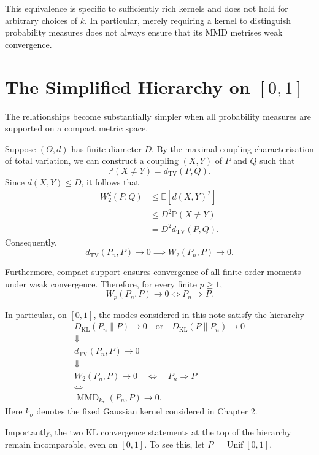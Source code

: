 \documentclass[
  11pt,
  a4paper,
  notitlepage
]{report}
\begin{document}
This equivalence is specific to sufficiently rich
kernels and does not hold for arbitrary choices
of $k$. In particular, merely requiring a kernel
to distinguish probability measures does not
always ensure that its MMD metrises weak convergence.

\section{The Simplified Hierarchy on $[0,1]$}
\label{the-simplified-hierarchy-on-01}

The relationships become substantially simpler
when all probability measures are supported on a
compact metric space.

Suppose $(\Theta,d)$ has finite diameter $D$.
By the maximal coupling characterisation of
total variation, we can construct a coupling
$(X,Y)$ of $P$ and $Q$ such that
\[
\mathbb P(X\neq Y)=d_{\mathrm{TV}}(P,Q).
\]
Since $d(X,Y)\leq D$, it follows that
\[
\begin{aligned}
W_2^2(P,Q)
&\leq\mathbb E[d(X,Y)^2]\\
&\leq D^2\mathbb P(X\neq Y)\\
&=D^2d_{\mathrm{TV}}(P,Q).
\end{aligned}
\]
Consequently,
\[
\boxed{
d_{\mathrm{TV}}(P_n,P)\to0
\implies W_2(P_n,P)\to0.
}
\]

Furthermore, compact support ensures convergence
of all finite-order moments under weak convergence.
Therefore, for every finite $p\geq1$,
\[
W_p(P_n,P)\to0
\iff P_n\Rightarrow P.
\]

In particular, on $[0,1]$, the modes considered
in this note satisfy the hierarchy
\[
\boxed{
\begin{gathered}
D_{\mathrm{KL}}(P_n\|P)\to0
\quad\text{or}\quad
D_{\mathrm{KL}}(P\|P_n)\to0
\\[5pt]
\Downarrow
\\[5pt]
d_{\mathrm{TV}}(P_n,P)\to0
\\[5pt]
\Downarrow
\\[5pt]
W_2(P_n,P)\to0
\quad\Longleftrightarrow\quad
P_n\Rightarrow P
\\[5pt]
\Longleftrightarrow
\\[5pt]
\operatorname{MMD}_{k_\sigma}(P_n,P)\to0.
\end{gathered}
}
\]
Here $k_\sigma$ denotes the fixed Gaussian kernel
considered in Chapter 2.

Importantly, the two KL convergence statements
at the top of the hierarchy remain incomparable,
even on $[0,1]$. To see this, let
$P=\operatorname{Unif}[0,1]$.
\end{document}
